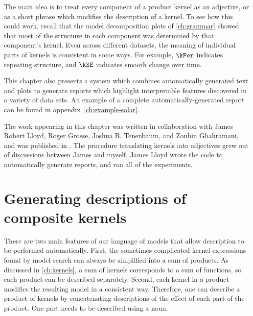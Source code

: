 The main idea is to treat every component of a product kernel as an adjective, or as a short phrase which modifies the description of a kernel.
To see how this could work, recall that the model decomposition plots of \cref{ch:grammar} showed that most of the structure in each component was determined by that component's kernel.
Even across different datasets, the meaning of individual parts of kernels is consistent in some ways.
For example, $\kPer$ indicates repeating structure, and $\kSE$ indicates smooth change over time.


This chapter also presents a system which combines automatically generated text and plots to generate reports which highlight interpretable features discovered in a variety of data sets.
An example of a complete automatically-generated report can be found in appendix~\ref{ch:example-solar}.

The work appearing in this chapter was written in collaboration with James Robert Lloyd, Roger Grosse, Joshua B. Tenenbaum, and Zoubin Ghahramani, and was published in \citet{LloDuvGroetal14}.
The procedure translating kernels into adjectives grew out of discussions between James and myself.
James Lloyd wrote the code to automatically generate reports, and ran all of the experiments.


\section{Generating descriptions of composite kernels}

There are two main features of our language of \gp{} models that allow description to be performed automatically.
First, the sometimes complicated kernel expressions found by model search can always be simplified into a sum of products.
As discussed in \cref{ch:kernels}, a sum of kernels corresponds to a sum of functions, so each product can be described separately.
Second, each kernel in a product modifies the resulting model in a consistent way.
Therefore, one can describe a product of kernels by concatenating descriptions of the effect of each part of the product.
One part needs to be described using a noun.

